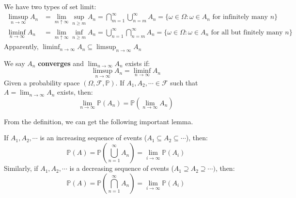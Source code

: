 \documentclass{huhtakm-template-book}
\newcommand{\prob}{\mathbb{P}}
\begin{document}
    \begin{rem} 
    We have two types of set limit:
        \begin{align*}
            \limsup_{n\to\infty}A_{n}&=\lim_{m\uparrow\infty}\sup_{n\geq m}A_{n}=\bigcap_{m=1}^{\infty}\bigcup_{n=m}^{\infty}A_{n}=\{\omega\in\Omega:\omega\in A_{n}\text{ for infinitely many }n\}\\
            \liminf_{n\to\infty}A_{n}&=\lim_{m\uparrow\infty}\inf_{n\geq m}A_{n}=\bigcup_{n=1}^{\infty}\bigcap_{n=m}^{\infty}A_{n}=\{\omega\in\Omega: \omega\in A_{n}\text{ for all but finitely many }n\}
        \end{align*}
        Apparently, $\liminf_{n\to\infty}A_{n}\subseteq\limsup_{n\to\infty}A_{n}$
    \end{rem}
    \begin{defn}
        We say $A_{n}$ \textbf{converges} and $\lim_{n\to\infty}A_{n}$ exists if:
        \begin{equation*}
            \limsup_{n\to\infty}A_{n}=\liminf_{n\to\infty}A_{n}
        \end{equation*}
        Given a probability space $(\Omega,\mathcal{F},\prob)$. If $A_{1},A_{2},\cdots\in\mathcal{F}$ such that $A=\lim_{n\to\infty}A_{n}$ exists, then:
        \begin{equation*}
            \lim_{n\to\infty}\prob(A_{n})=\prob\left(\lim_{n\to\infty}A_{n}\right)
        \end{equation*}
    \end{defn}
    From the definition, we can get the following important lemma.
    \begin{lem}
    \label{Continuous probability}
        If $A_{1},A_{2},\cdots$ is an increasing sequence of events ($A_{1}\subseteq A_{2}\subseteq\cdots$), then:
        \begin{equation*}
            \prob(A)=\prob\left(\bigcup_{n=1}^{\infty}A_{n}\right)=\lim_{i\to\infty}\prob(A_{i})
        \end{equation*}
        Similarly, if $A_{1},A_{2},\cdots$ is a decreasing sequence of events ($A_{1}\supseteq A_{2}\supseteq\cdots)$, then:
        \begin{equation*}
            \prob(A)=\prob\left(\bigcap_{n=1}^{\infty}A_{n}\right)=\lim_{i\to\infty}\prob(A_{i})
        \end{equation*}
    \end{lem}
\end{document}
